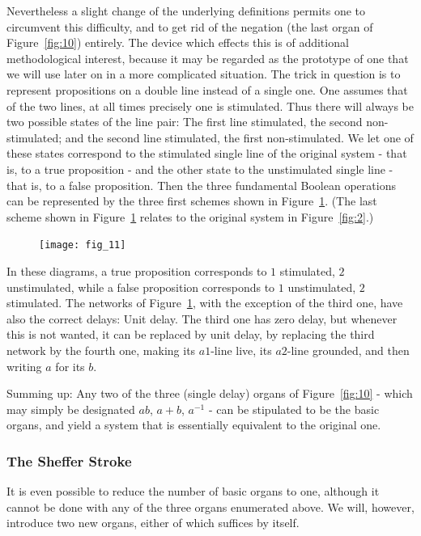 \documentclass[twocolumn,preprintnumbers,amsmath,amssymb,floatfix]{revtex4}
\begin{document}
Nevertheless a slight change of the underlying definitions permits
one to circumvent this difficulty, and to get rid of the negation
(the last organ of Figure~\ref{fig:10}) entirely. The device which
effects this is of additional methodological interest, because it
may be regarded as the prototype of one that we will use later on
in a more complicated situation. The trick in question is to
represent propositions on a double line instead of a single one.
One assumes that of the two lines, at all times precisely one is
stimulated. Thus there will always be two possible states of the
line pair: The first line stimulated, the second non-stimulated;
and the second line stimulated, the first non-stimulated. We let
one of these states correspond to the stimulated single line of
the original system - that is, to a true proposition - and the
other state to the unstimulated single line - that is, to a false
proposition. Then the three fundamental Boolean operations can be
represented by the three first schemes shown in
Figure~\ref{fig:11}. (The last scheme shown in Figure~\ref{fig:11}
relates to the original system in Figure~\ref{fig:2}.)

\begin{figure}
\texttt{[image: fig\_11]}
\caption{\label{fig:11}}
\end{figure}

In these diagrams, a true proposition corresponds to $1$
stimulated, $2$ unstimulated, while a false proposition
corresponds to $1$ unstimulated, $2$ stimulated. The networks of
Figure~\ref{fig:11}, with the exception of the third one, have
also the correct delays: Unit delay. The third one has zero delay,
but whenever this is not wanted, it can be replaced by unit delay,
by replacing the third network by the fourth one, making its
$a1$-line live, its $a2$-line grounded, and then writing $a$ for
its $b$.

Summing up: Any two of the three (single delay) organs of
Figure~\ref{fig:10} - which may simply be designated $ab$, $a+b$,
$a^{-1}$ - can be stipulated to be the basic organs, and yield a
system that is essentially equivalent to the original one.

\subsubsection{\label{sec:four2_1}The Sheffer Stroke} It is even
possible to reduce the number of basic organs to one, although it
cannot be done with any of the three organs enumerated above. We
will, however, introduce two new organs, either of which suffices
by itself.
\end{document}
